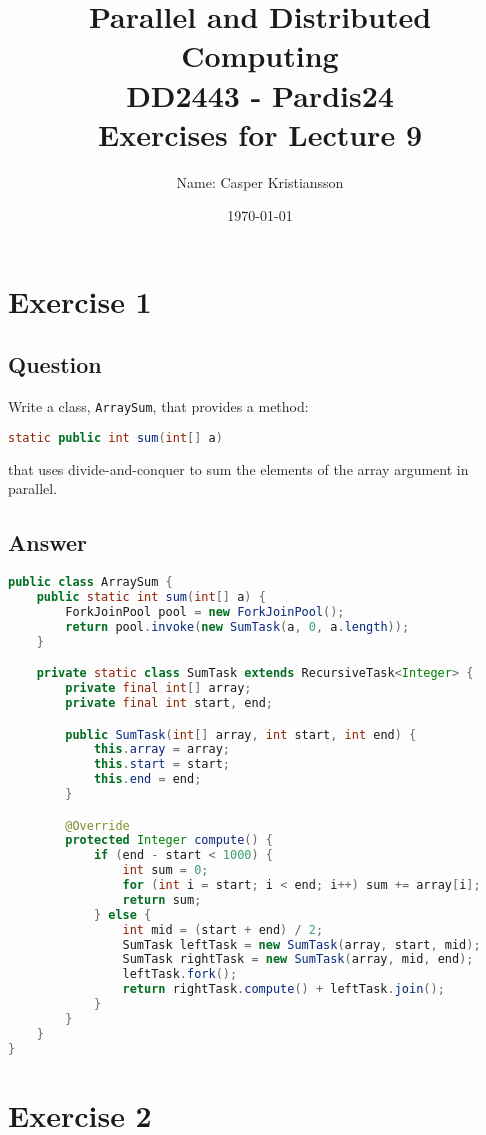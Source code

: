 \documentclass{article}
\title{\textbf{Parallel and Distributed Computing\\DD2443 - Pardis24\\Exercises for Lecture 9}}
\author{Name: Casper Kristiansson}
\date{\today}
\begin{document}
\setlength\parindent{0pt}
\setlength{\parskip}{\bigskipamount}

\maketitle

\section*{Exercise 1}
\subsection*{Question}
Write a class, \texttt{ArraySum}, that provides a method:
\begin{lstlisting}[language=Java]
static public int sum(int[] a)
\end{lstlisting}
that uses divide-and-conquer to sum the elements of the array argument in parallel.

\subsection*{Answer}
\begin{lstlisting}[language=Java]
public class ArraySum {
    public static int sum(int[] a) {
        ForkJoinPool pool = new ForkJoinPool();
        return pool.invoke(new SumTask(a, 0, a.length));
    }

    private static class SumTask extends RecursiveTask<Integer> {
        private final int[] array;
        private final int start, end;

        public SumTask(int[] array, int start, int end) {
            this.array = array;
            this.start = start;
            this.end = end;
        }

        @Override
        protected Integer compute() {
            if (end - start < 1000) {
                int sum = 0;
                for (int i = start; i < end; i++) sum += array[i];
                return sum;
            } else {
                int mid = (start + end) / 2;
                SumTask leftTask = new SumTask(array, start, mid);
                SumTask rightTask = new SumTask(array, mid, end);
                leftTask.fork();
                return rightTask.compute() + leftTask.join();
            }
        }
    }
}
\end{lstlisting}




\section*{Exercise 2}
\end{document}

